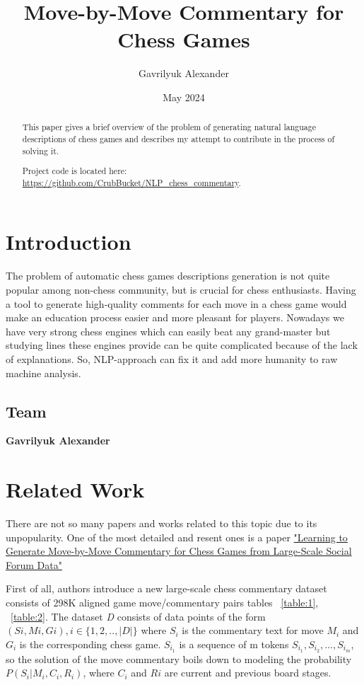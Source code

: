 \documentclass{article}
\title{Move-by-Move Commentary for Chess Games}
\author{Gavrilyuk Alexander}
\date{May 2024}
\begin{document}
\maketitle
\begin{abstract}
    This paper gives a brief overview of the problem of generating natural language descriptions of chess games and describes my attempt to contribute in the process of solving it.
    
    Project code is located here: \url{https://github.com/CrubBucket/NLP_chess_commentary}.
\end{abstract}



\section{Introduction}
The problem of automatic chess games descriptions generation is not quite popular among non-chess community, but is crucial for chess enthusiasts. Having a tool to generate high-quality comments for each move in a chess game would make an education process easier and more pleasant for players. Nowadays we have very strong chess engines which can easily beat any grand-master but studying lines these engines provide can be quite complicated because of the lack of explanations. So, NLP-approach can fix it and add more humanity to raw machine analysis.
\subsection{Team}

\textbf{Gavrilyuk Alexander}



\section{Related Work}
\label{sec:related}
There are not so many papers and works related to this topic due to its unpopularity. One of the most detailed and resent ones is a paper \href{https://aclanthology.org/P18-1154/}{"Learning to Generate Move-by-Move Commentary for Chess Games from Large-Scale Social Forum Data"}\cite{article}

First of all, authors introduce a new large-scale chess commentary dataset consists of 298K aligned game move/commentary pairs tables ~\ref{table:1}, ~\ref{table:2}. The dataset \textit{D} consists of data points of the form $(Si, Mi, Gi), i \in \{1, 2, .., |D|\}$ where $S_i$ is the commentary text for move $M_i$ and $G_i$ is the corresponding chess game. $S_{i_1}$ is a sequence of m tokens $S_{i_1}, S_{i_2}, ..., S_{i_m}$, so the solution of the move commentary boils down to modeling the probability $P(S_i|M_i, C_i, R_i)$, where $C_i$ and $Ri$ are current and previous board stages.
\end{document}
